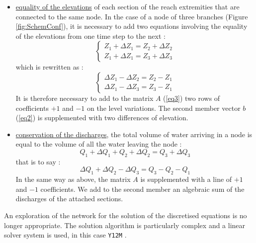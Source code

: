 \begin{itemize}
 \item \underline{equality of the elevations} of each section of the reach extremities that are connected to the same node. In the case of a node of three branches (Figure \ref{fig:SchemConf}), it is necessary to add two equations involving the equality of the elevations from one time step to the next :
  \begin{equation}
    \left \lbrace
     \begin{array}{l}
       Z_1 + \Delta Z_1 = Z_2 + \Delta Z_2 \\
       Z_1 + \Delta Z_1 = Z_3 + \Delta Z_3
     \end{array}
    \right.
  \end{equation}
	which is rewritten as :
  \begin{equation}
    \left \lbrace
     \begin{array}{l}
       \Delta Z_1 - \Delta Z_2 = Z_2 - Z_1\\
       \Delta Z_1 - \Delta Z_3 = Z_3 - Z_1
     \end{array}
    \right.
  \end{equation}
  It is therefore necessary to add to the matrix $A$ (\ref{eq3}) two rows of coefficients $+1$ and $-1$ on the level variations. The second member vector $b$ (\ref{eq2}) is supplemented with two differences of elevation.

  \item \underline{conservation of the discharges}, the total volume of water arriving in a node is equal to the volume of all the water leaving the node :
   \begin{equation}
     Q_1 + \Delta Q_1 + Q_2 + \Delta Q_2 = Q_3 + \Delta Q_3
   \end{equation}
   that is to say :
   \begin{equation}
     \Delta Q_1 + \Delta Q_2 - \Delta Q_3 = Q_3 -Q_2 - Q_1
   \end{equation}
   In the same way as above, the matrix $A$ is supplemented with a line of $+1$ and $-1$ coefficients.  We add to the second member an algebraic sum of the discharges of the attached sections.
\end{itemize}

An exploration of the network for the solution of the discretised equations is no longer appropriate. The solution algorithm is particularly complex and a linear solver system is used, in this case \texttt{Y12M} \cite{ZLATEV81}.


